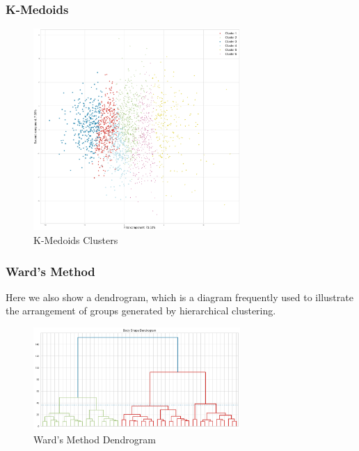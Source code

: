 \documentclass[12pt,a4paper,openany,UKenglish]{scrreprt}
\begin{document}
\subsubsection{K-Medoids}
\begin{figure}[H]
	\centering
	\caption{K-Medoids Clusters}
	\includegraphics[width=0.7\textwidth]{../Images/FMedoidsProjection.png}
\end{figure}

\subsubsection{Ward's Method}
Here we also show a dendrogram, which is a diagram frequently used to illustrate the arrangement of groups generated by hierarchical clustering.
\begin{figure}[H]
	\centering
	\caption{Ward's Method Dendrogram}
	\includegraphics[width=0.7\textwidth]{../Images/FDendrogram.png}
\end{figure}
\end{document}
